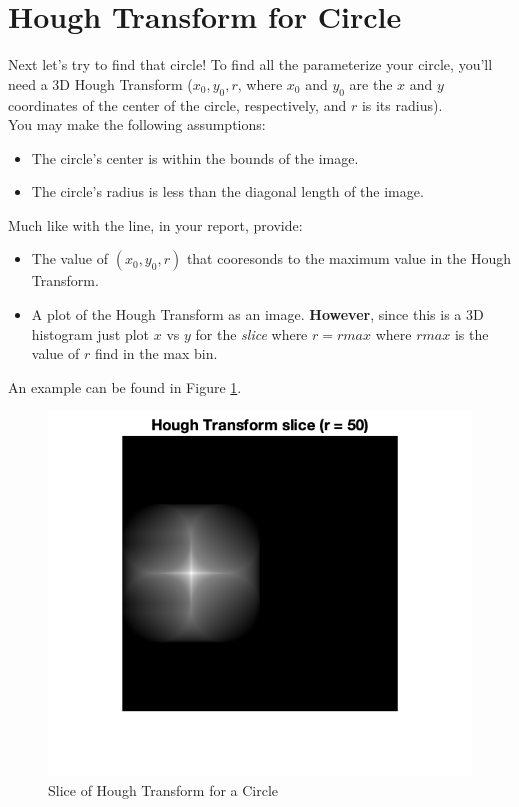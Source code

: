 \documentclass[12pt]{article}
\begin{document}
\newpage
\section{Hough Transform for Circle}
Next let's try to find that circle!  To find all the parameterize your circle, you'll need a 3D Hough Transform ($x_0, y_0, r$, where $x_0$ and $y_0$ are the $x$ and $y$ coordinates of the center of the circle, respectively, and $r$ is its radius).\\

\noindent
You may make the following assumptions:
\begin{itemize}
\item The circle's center is within the bounds of the image.
\item The circle's radius is less than the diagonal length of the image.
\end{itemize}

\noindent
Much like with the line, in your report, provide:
\begin{itemize}
\item The value of $(x_0, y_0, r)$ that cooresonds to the maximum value in the Hough Transform.
\item A plot of the Hough Transform as an image. \textbf{However}, since this is a 3D histogram just plot $x$ vs $y$ for the \emph{slice} where $r=rmax$ where $rmax$ is the value of $r$ find in the max bin.
\end{itemize}

\noindent
An example can be found in Figure \ref{fig3}.

\begin{figure}[H]
\begin{center}
\includegraphics[width=15cm]{part4.png}
\caption{Slice of Hough Transform for a Circle}
\label{fig3}
\end{center}
\end{figure}
\end{document}
